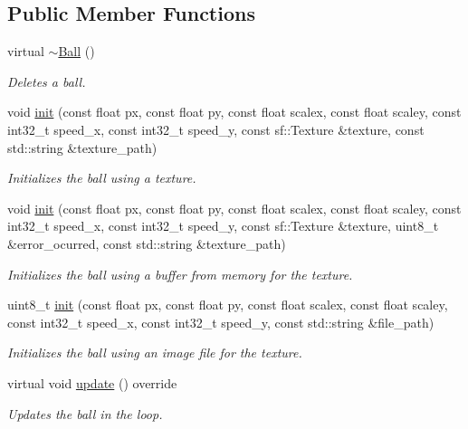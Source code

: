 \subsection*{Public Member Functions}
\begin{DoxyCompactItemize}
\item 
virtual \hyperlink{class_ball_a78aa1f06b39fc9f81df82bef399c475c}{$\sim$\+Ball} ()
\begin{DoxyCompactList}\small\item\em Deletes a ball. \end{DoxyCompactList}\item 
void \hyperlink{class_ball_a29f8aab00cd8c1211e68926779504bab}{init} (const float px, const float py, const float scalex, const float scaley, const int32\+\_\+t speed\+\_\+x, const int32\+\_\+t speed\+\_\+y, const sf\+::\+Texture \&texture, const std\+::string \&texture\+\_\+path)
\begin{DoxyCompactList}\small\item\em Initializes the ball using a texture. \end{DoxyCompactList}\item 
void \hyperlink{class_ball_aa243193c3b41a94fa289a7b341fc53c4}{init} (const float px, const float py, const float scalex, const float scaley, const int32\+\_\+t speed\+\_\+x, const int32\+\_\+t speed\+\_\+y, const sf\+::\+Texture \&texture, uint8\+\_\+t \&error\+\_\+ocurred, const std\+::string \&texture\+\_\+path)
\begin{DoxyCompactList}\small\item\em Initializes the ball using a buffer from memory for the texture. \end{DoxyCompactList}\item 
uint8\+\_\+t \hyperlink{class_ball_ad0c5b2700e8eae3c810d5dfe075f7673}{init} (const float px, const float py, const float scalex, const float scaley, const int32\+\_\+t speed\+\_\+x, const int32\+\_\+t speed\+\_\+y, const std\+::string \&file\+\_\+path)
\begin{DoxyCompactList}\small\item\em Initializes the ball using an image file for the texture. \end{DoxyCompactList}\item 
virtual void \hyperlink{class_ball_a26c877660343d086a9d45891659474f8}{update} () override
\begin{DoxyCompactList}\small\item\em Updates the ball in the loop. \end{DoxyCompactList}\end{DoxyCompactItemize}
